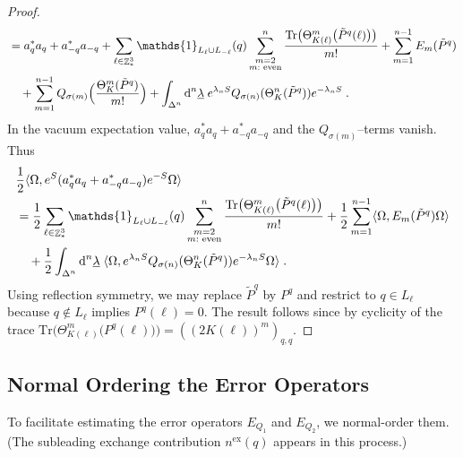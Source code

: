 \documentclass[12pt,a4paper]{article}
\numberwithin{equation}{section}
\newcommand{\1}{\mathbb{I}}
\newcommand{\di}{\textnormal{d}}
\newcommand{\ex}{\mathrm{ex}}
\DeclareMathOperator{\Z}{\mathbb{Z}}
\newcommand{\half}{\frac{1}{2}}
\theoremstyle{plain}
\theoremstyle{definition}
\theoremstyle{remark}
\theoremstyle{plain}
\theoremstyle{definition}
\theoremstyle{remark}
\begin{document}
\begin{proof}
\begin{equation}
\begin{aligned}
	&= a_q^* a_q + a_{-q}^* a_{-q}
		+ \sum_{\ell\in \Z^3_*} \mathds{1}_{L_\ell \cup L_{-\ell}}(q) \sum_{\substack{m=2\\m:\textnormal{ even}}}^n \frac{\mathrm{Tr} \big(\Theta^m_{K(\ell)} \big( \tilde{P}^q(\ell) \big) \big)}{m!}
		+ \sum_{m=1}^{n-1} E_m(\tilde{P}^q) \\
	&\quad+ \sum_{m=1}^{n-1}
		Q_{\sigma(m)} \Big( \frac{\Theta^m_{K}(\tilde{P}^q)}{m!} \Big)
		+\int_{\Delta^n} \di^n \underline{\lambda} \;
		e^{\lambda_n S}Q_{\sigma(n)}(\Theta^n_K (\tilde{P}^q)) e^{-\lambda_n S} \;.
\end{aligned}
\end{equation}
In the vacuum expectation value, $ a_q^* a_q + a_{-q}^* a_{-q} $ and the $ Q_{\sigma(m)} $--terms vanish. Thus
\begin{equation}
\begin{aligned}
	& \half \langle \Omega, e^{S} (a_q^* a_q + a_{-q}^* a_{-q}) e^{-S} \Omega \rangle \\
	&= \half \sum_{\ell\in \Z^3_*} \mathds{1}_{L_\ell \cup L_{-\ell}}(q) \sum_{\substack{m=2\\m:\textnormal{ even}}}^n \frac{\mathrm{Tr} \big(\Theta^m_{K(\ell)} \big( \tilde{P}^q(\ell) \big) \big)}{m!}
	+ \half \sum_{m=1}^{n-1} \langle \Omega, E_m(\tilde{P}^q) \Omega \rangle \\
	&\quad + \half \int_{\Delta^n} \di^n \underline{\lambda} \;
		\langle \Omega, e^{\lambda_n S}Q_{\sigma(n)}(\Theta^n_{K}(\tilde{P}^q)) e^{-\lambda_n S} \Omega \rangle \;.
\end{aligned}
\end{equation}
Using reflection symmetry, we may replace $ \tilde{P}^q $ by $ P^q $ and restrict to $ q \in L_\ell $ because $ q \notin L_\ell$ implies $P^q(\ell) = 0 $. The result follows since by cyclicity of the trace $ \mathrm{Tr} \big(\Theta^m_{K(\ell)} \big( P^q(\ell) \big) \big) = ((2K(\ell))^m)_{q,q} $.
\end{proof}






\subsection{Normal Ordering the Error Operators}
\label{sec:extraction_ex}

To facilitate estimating the error operators $ E_{Q_1} $ and $ E_{Q_2} $, we normal-order them. (The subleading exchange contribution $ n^{\ex}(q) $ appears in this process.)
\end{document}
